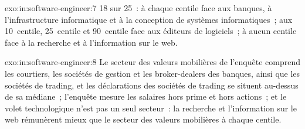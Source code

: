\begin{solution}{exo:in:software-engineer:7}
18 sur 25~: à chaque centile face aux banques, à l'infrastructure informatique et à la conception de systèmes informatiques~; aux 10~centile, 25~centile et
90~centile face aux éditeurs de logiciels~; à aucun centile face à la recherche et à l'information sur le web.
\end{solution}

\begin{solution}{exo:in:software-engineer:8}
Le secteur des valeurs mobilières de l'enquête comprend les courtiers, les sociétés de gestion et les broker-dealers des banques, ainsi que les sociétés de trading, et
les déclarations des sociétés de trading se situent au-dessus de sa médiane~; l'enquête mesure les salaires hors prime et hors actions~; et le
volet technologique n'est pas un seul secteur~: la recherche et l'information sur le web rémunèrent mieux que le secteur des valeurs mobilières à chaque centile.
\end{solution}

